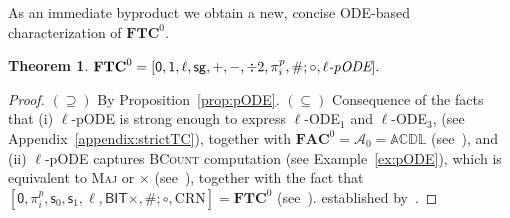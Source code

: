 \documentclass[11pt, oneside]{article}
\newcommand{\ACDL}{\mathbb{ACDL}}
\newcommand{\fun}[1]{\mathsf{#1}}
\newcommand{\AC}{\mathbf{FAC}}
\newcommand{\TC}{\mathbf{FTC}}
\newtheorem{theorem}{Theorem}
\theoremstyle{definition}
\begin{document}
\noindent
As an immediate byproduct we obtain a new, concise ODE-based characterization of $\TC^0$.

\begin{theorem}
    $\TC^0 = [\fun{0}, \fun{1}, \ell, \fun{sg}, +, -, \div 2, \pi^p_i, \#; \circ, \ell\emph{-pODE}].$
\end{theorem}
\begin{proof}
\begin{sloppypar}
    $(\supseteq)$ By Proposition~\ref{prop:pODE}. 
    $(\subseteq)$ Consequence of the facts that (i) $\ell$-pODE is strong enough to express $\ell$-ODE$_1$ and $\ell$-ODE$_3$,
    (see Appendix~\ref{appendix:strictTC}), 
    together with $\AC^0=\mathcal{A}_0=\ACDL$ (see~\cite{ADK24a,Clote1990}), and (ii) $\ell$-pODE captures \textsc{BCount} computation (see Example~\ref{ex:pODE}), which is equivalent to \textsc{Maj} or $\times$ (see~\cite{Vollmer}), together with the fact that $[\fun{0}, \pi^p_i, \fun{s}_0, \fun{s}_1, \ell, \fun{BIT} \times, \#; \circ, \text{CRN}]=\TC^0$ (see~\cite{CloteTakeuti}).
established by~\cite{CloteTakeuti}.%
\end{sloppypar}
\end{proof}
\end{document}
